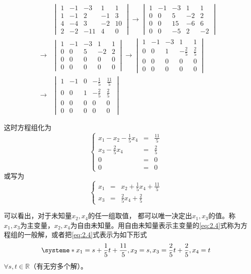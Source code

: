 \begin{solution}
\begin{eqnarray*}
& & \begin{vmatrix} 1 & -1 & -3 & 1 & 1 \\ 1 & -1 & 2 & -1 & 3 \\ 4 & -4 & 3 & -2 & 10 \\ 2 & -2 & -11 & 4 & 0 \end{vmatrix} \longrightarrow \begin{vmatrix} 1 & -1 & -3 & 1 & 1 \\ 0 & 0 & 5 & -2 & 2 \\ 0 & 0 & 15 & -6 & 6 \\ 0 & 0 & -5 & 2 & -2 \end{vmatrix} \\
& \longrightarrow & \begin{vmatrix} 1 & -1 & -3 & 1 & 1 \\ 0 & 0 & 5 & -2 & 2 \\ 0 & 0 & 0 & 0 & 0 \\ 0 & 0 & 0 & 0 & 0 \end{vmatrix}
\longrightarrow \begin{vmatrix} 1 & -1 & -3 & 1 & 1 \\ 0 & 0 & 1 & -\frac25 & \frac25 \\ 0 & 0 & 0 & 0 & 0 \\ 0 & 0 & 0 & 0 & 0 \end{vmatrix} \\
& \longrightarrow & \begin{vmatrix} 1 & -1 & 0 & -\frac15 & \frac{11}{5} \\ 0 & 0 & 1 & -\frac25 & \frac25 \\ 0 & 0 & 0 & 0 & 0 \\ 0 & 0 & 0 & 0 & 0 \end{vmatrix}
\end{eqnarray*}

这时方程组化为
$$\left\{ \begin{array}{rcl} x_1 - x_2 - \frac15 x_4 & = & \frac{11}{5} \\ x_3 - \frac25x_4 & = & \frac25 \\ 0 & = & 0 \\ 0 & = & 0 \end{array}\right.$$
或写为
\begin{equation} \label{eq:2.4}
\left\{ \begin{array}{rcl} x_1 & = & x_2 + \frac15 x_4 + \frac{11}{5} \\ x_3 & = & \frac25x_4 + \frac25 \end{array}\right.
\end{equation}

可以看出，对于未知量$x_2, x_4$的任一组取值， 都可以唯一决定出$x_1, x_3$的值。称$x_1, x_3$为主变量，$x_2, x_4$为自由未知量。用自由未知量表示主变量的\eqref{eq:2.4}式称为方程组的一般解，或者把\eqref{eq:2.4}式表示为如下形式
$$\systeme*{x_1 = s + \frac15 t + \frac{11}{5}, x_2 = s, x_3 = \frac25 t + \frac25, x_4 = t}$$
$\forall s,t \in \mathbb{R}$（有无穷多个解）。
\end{solution}

